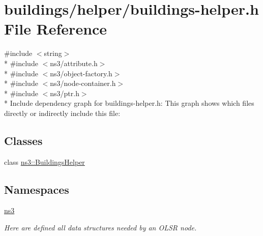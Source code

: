 \hypertarget{buildings-helper_8h}{}\section{buildings/helper/buildings-\/helper.h File Reference}
\label{buildings-helper_8h}
{\ttfamily \#include $<$string$>$}\\*
{\ttfamily \#include $<$ns3/attribute.\+h$>$}\\*
{\ttfamily \#include $<$ns3/object-\/factory.\+h$>$}\\*
{\ttfamily \#include $<$ns3/node-\/container.\+h$>$}\\*
{\ttfamily \#include $<$ns3/ptr.\+h$>$}\\*
Include dependency graph for buildings-\/helper.h\+:
This graph shows which files directly or indirectly include this file\+:
\subsection*{Classes}
\begin{DoxyCompactItemize}
\item 
class \hyperlink{classns3_1_1BuildingsHelper}{ns3\+::\+Buildings\+Helper}
\end{DoxyCompactItemize}
\subsection*{Namespaces}
\begin{DoxyCompactItemize}
\item 
 \hyperlink{namespacens3}{ns3}
\begin{DoxyCompactList}\small\item\em Here are defined all data structures needed by an O\+L\+SR node. \end{DoxyCompactList}\end{DoxyCompactItemize}
